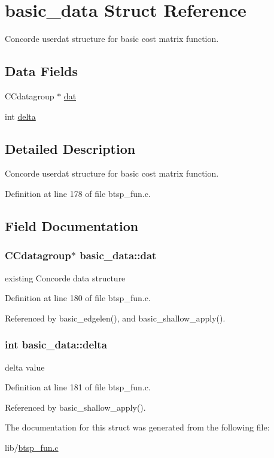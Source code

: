 \hypertarget{structbasic__data}{
\section{basic\_\-data Struct Reference}
\label{structbasic__data}
}
Concorde userdat structure for basic cost matrix function.  


\subsection*{Data Fields}
\begin{CompactItemize}
\item 
CCdatagroup $\ast$ \hyperlink{structbasic__data_02bf35a1e012cfcd2a2e39fb5cf0b5aa}{dat}
\item 
int \hyperlink{structbasic__data_6ca72860561070179323aeacf49c81d8}{delta}
\end{CompactItemize}


\subsection{Detailed Description}
Concorde userdat structure for basic cost matrix function. 

Definition at line 178 of file btsp\_\-fun.c.

\subsection{Field Documentation}
\hypertarget{structbasic__data_02bf35a1e012cfcd2a2e39fb5cf0b5aa}{
\subsubsection{\setlength{\rightskip}{0pt plus 5cm}CCdatagroup$\ast$ {\bf basic\_\-data::dat}}}
\label{structbasic__data_02bf35a1e012cfcd2a2e39fb5cf0b5aa}


existing Concorde data structure 

Definition at line 180 of file btsp\_\-fun.c.

Referenced by basic\_\-edgelen(), and basic\_\-shallow\_\-apply().\hypertarget{structbasic__data_6ca72860561070179323aeacf49c81d8}{
\subsubsection{\setlength{\rightskip}{0pt plus 5cm}int {\bf basic\_\-data::delta}}}
\label{structbasic__data_6ca72860561070179323aeacf49c81d8}


delta value 

Definition at line 181 of file btsp\_\-fun.c.

Referenced by basic\_\-shallow\_\-apply().

The documentation for this struct was generated from the following file:\begin{CompactItemize}
\item 
lib/\hyperlink{btsp__fun_8c}{btsp\_\-fun.c}\end{CompactItemize}
